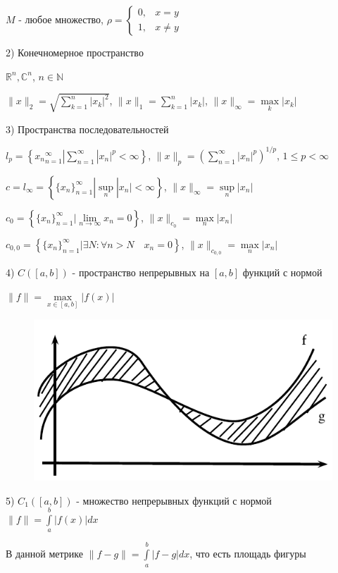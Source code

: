 \documentclass[a4paper]{report}
\begin{document}
$M$ - любое множество, $\rho=\begin{cases} 0,&x=y\\1,&x\ne y\end{cases}$

2) Конечномерное пространство

$\mathbb R^n,\mathbb C^n$, $n\in\mathbb N$

$\|x\|_2=\sqrt{\sum\limits_{k=1}^n|x_k|^2}$,
$\|x\|_1=\sum\limits_{k=1}^n|x_k|$, $\|x\|_{\infty}=\max\limits_k|x_k|$

3) Пространства последовательностей

$l_p=\left\{{x_n}_{n=1}^\infty|\sum\limits_{n=1}^\infty|x_n|^p<\infty\right\}$, $\|x\|_p=\left(\sum\limits_{n=1}^\infty|x_n|^p\right)^{1/p}$, $1\le p<\infty$

$c=l_\infty=\left\{\{x_n\}_{n=1}^\infty|\sup\limits_n|x_n|<\infty\right\}$, $\|x\|_\infty=\sup\limits_n|x_n|$

$c_0=\left\{\{x_n\}_{n=1}^\infty|\lim\limits_{n\to\infty}x_n=0\right\}$, $\|x\|_{c_0}=\max\limits_n|x_n|$

$c_{0,0}=\left\{\{x_n\}_{n=1}^\infty|\exists N:\forall n>N\quad x_n=0\right\}$, $\|x\|_{c_{0,0}}=\max\limits_n|x_n|$

4) $C([a,b])$ - пространство непрерывных на $[a,b]$ функций с нормой

$\|f\|=\max\limits_{x\in[a,b]}|f(x)|$

\noindent
\begin{figure}
\includegraphics[width=\linewidth]{1}
\end{figure}

5) $C_1([a,b])$ - множество непрерывных функций с нормой $\|f\|=\displaystyle\int\limits_a^b|f(x)|dx$

В данной метрике $\|f-g\|=\displaystyle\int\limits_a^b|f-g|dx$, что есть площадь фигуры
\end{document}
